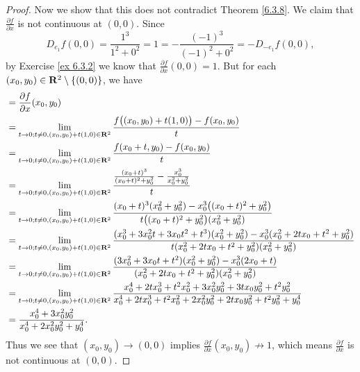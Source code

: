 \begin{proof}
    Now we show that this does not contradict Theorem \ref{6.3.8}.
    We claim that \(\frac{\partial f}{\partial x}\) is not continuous at \((0, 0)\).
    Since
    \[
        D_{e_1} f(0, 0) = \frac{1^3}{1^2 + 0^2} = 1 = -\frac{(-1)^3}{(-1)^2 + 0^2} = -D_{-e_1} f(0, 0),
    \]
    by Exercise \ref{ex 6.3.2} we know that \(\frac{\partial f}{\partial x}(0, 0) = 1\).
    But for each \((x_0, y_0) \in \mathbf{R}^2 \setminus \{(0, 0)\}\), we have
    \begin{align*}
         & = \frac{\partial f}{\partial x}(x_0, y_0)                                                                                                                                                                                      \\
         & = \lim_{t \to 0 ; t \neq 0, (x_0, y_0) + t(1, 0) \in \mathbf{R}^2} \frac{f\big((x_0, y_0) + t(1, 0)\big) - f(x_0, y_0)}{t}                                                                                                             \\
         & = \lim_{t \to 0 ; t \neq 0, (x_0, y_0) + t(1, 0) \in \mathbf{R}^2} \frac{f(x_0 + t, y_0) - f(x_0, y_0)}{t}                                                                                                                             \\
         & = \lim_{t \to 0 ; t \neq 0, (x_0, y_0) + t(1, 0) \in \mathbf{R}^2} \frac{\frac{(x_0 + t)^3}{(x_0 + t)^2 + y_0^2} - \frac{x_0^3}{x_0^2 + y_0^2}}{t}                                                                                     \\
         & = \lim_{t \to 0 ; t \neq 0, (x_0, y_0) + t(1, 0) \in \mathbf{R}^2} \frac{(x_0 + t)^3 (x_0^2 + y_0^2) - x_0^3 \big((x_0 + t)^2 + y_0^2\big)}{t \big((x_0 + t)^2 + y_0^2\big) (x_0^2 + y_0^2)}                                           \\
         & = \lim_{t \to 0 ; t \neq 0, (x_0, y_0) + t(1, 0) \in \mathbf{R}^2} \frac{(x_0^3 + 3 x_0^2 t + 3 x_0 t^2 + t^3) (x_0^2 + y_0^2) - x_0^3 (x_0^2 + 2 t x_0 + t^2 + y_0^2)}{t (x_0^2 + 2 t x_0 + t^2 + y_0^2) (x_0^2 + y_0^2)}             \\
         & = \lim_{t \to 0 ; t \neq 0, (x_0, y_0) + t(1, 0) \in \mathbf{R}^2} \frac{(3 x_0^2 + 3 x_0 t + t^2) (x_0^2 + y_0^2) - x_0^3 (2 x_0 + t)}{(x_0^2 + 2 t x_0 + t^2 + y_0^2) (x_0^2 + y_0^2)}                                               \\
         & = \lim_{t \to 0 ; t \neq 0, (x_0, y_0) + t(1, 0) \in \mathbf{R}^2} \frac{x_0^4 + 2 t x_0^3 + t^2 x_0^2 + 3 x_0^2 y_0^2 + 3 t x_0 y_0^2 + t^2 y_0^2}{x_0^4 + 2 t x_0^3 + t^2 x_0^2 + 2 x_0^2 y_0^2 + 2 t x_0 y_0^2 + t^2 y_0^2 + y_0^4} \\
         & = \frac{x_0^4 + 3 x_0^2 y_0^2}{x_0^4 + 2 x_0^2 y_0^2 + y_0^4}.
    \end{align*}
    Thus we see that \((x_0, y_0) \to (0, 0)\) implies \(\frac{\partial f}{\partial x}(x_0, y_0) \not\to 1\), which means \(\frac{\partial f}{\partial x}\) is not continuous at \((0, 0)\).
\end{proof}

